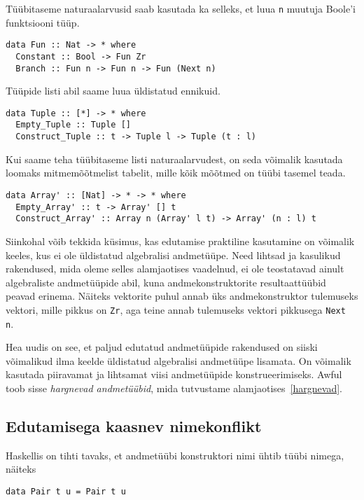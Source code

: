 \documentclass[12pt]{article}
\begin{document}
      Tüübitaseme naturaalarvusid saab kasutada ka selleks, et luua \verb!n! muutuja Boole'i funktsiooni tüüp.

      \begin{verbatim}data Fun :: Nat -> * where
  Constant :: Bool -> Fun Zr
  Branch :: Fun n -> Fun n -> Fun (Next n)\end{verbatim}

      Tüüpide listi abil saame luua üldistatud ennikuid.

      \begin{verbatim}data Tuple :: [*] -> * where
  Empty_Tuple :: Tuple []
  Construct_Tuple :: t -> Tuple l -> Tuple (t : l)\end{verbatim}

      Kui saame teha tüübitaseme listi naturaalarvudest, on seda võimalik kasutada loomaks mitmemõõtmelist tabelit, mille kõik mõõtmed on tüübi tasemel teada.

      \begin{verbatim}data Array' :: [Nat] -> * -> * where
  Empty_Array' :: t -> Array' [] t
  Construct_Array' :: Array n (Array' l t) -> Array' (n : l) t\end{verbatim}

      Siinkohal võib tekkida küsimus, kas edutamise praktiline kasutamine on võimalik keeles, kus ei ole üldistatud algebralisi andmetüüpe. Need lihtsad ja kasulikud rakendused, mida oleme selles alamjaotises vaadelnud, ei ole teostatavad ainult algebraliste andmetüüpide abil, kuna andmekonstruktorite resultaattüübid peavad erinema. Näiteks vektorite puhul annab üks andmekonstruktor tulemuseks vektori, mille pikkus on \verb!Zr!, aga teine annab tulemuseks vektori pikkusega \verb!Next n!.

      Hea uudis on see, et paljud edutatud andmetüüpide rakendused on siiski võimalikud ilma keelde üldistatud algebralisi andmetüüpe lisamata. On võimalik kasutada piiravamat ja lihtsamat viisi andmetüüpide konstrueerimiseks. Awful toob sisse \textit{hargnevad andmetüübid}, mida tutvustame alamjaotises~\ref{hargnevad}.
    \subsection{Edutamisega kaasnev nimekonflikt}
      Haskellis on tihti tavaks, et andmetüübi konstruktori nimi ühtib tüübi nimega, näiteks

      \begin{verbatim}data Pair t u = Pair t u\end{verbatim}
\end{document}
